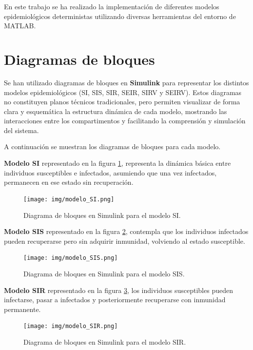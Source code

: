 En este trabajo se ha realizado la implementación de diferentes modelos epidemiológicos deterministas utilizando diversas herramientas del entorno de MATLAB.
\section{Diagramas de bloques}
Se han utilizado diagramas de bloques en \textbf{Simulink} para representar los distintos modelos epidemiológicos (SI, SIS, SIR, SEIR, SIRV y SEIRV). 
Estos diagramas no constituyen planos técnicos tradicionales, pero permiten visualizar de forma clara y esquemática la estructura dinámica de cada modelo, mostrando las interacciones entre los compartimentos y facilitando la comprensión y simulación del sistema.

A continuación se muestran los diagramas de bloques para cada modelo.

\textbf{Modelo SI} representado en la figura \ref{fig: diagrama de bloques en Simulink para el modelo SI}, representa la dinámica básica entre individuos susceptibles e infectados, asumiendo que una vez infectados, permanecen en ese estado sin recuperación.
\begin{figure}[H]
        \centering
        \texttt{[image: img/modelo\_SI.png]}
        \caption{Diagrama de bloques en Simulink para el modelo SI.}
        \label{fig: diagrama de bloques en Simulink para el modelo SI}
        
\end{figure}

\textbf{Modelo SIS} representado en la figura \ref{fig: diagrama de bloques en Simulink para el modelo SIS}, contempla que los individuos infectados pueden recuperarse pero sin adquirir inmunidad, volviendo al estado susceptible.
\begin{figure}[H]
        \centering
        \texttt{[image: img/modelo\_SIS.png]}
        \caption{Diagrama de bloques en Simulink para el modelo SIS.}
        \label{fig: diagrama de bloques en Simulink para el modelo SIS}
        
\end{figure}

\textbf{Modelo SIR} representado en la figura \ref{fig: diagrama de bloques en Simulink para el modelo SIR}, los individuos susceptibles pueden infectarse, pasar a infectados y posteriormente recuperarse con inmunidad permanente.


\begin{figure}[H]
        \centering
        \texttt{[image: img/modelo\_SIR.png]}
        \caption{Diagrama de bloques en Simulink para el modelo SIR.}
        \label{fig: diagrama de bloques en Simulink para el modelo SIR}
        
\end{figure}


